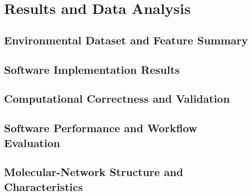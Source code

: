 
\chapter{Results and Data Analysis}\label{ch:results}

  \section{Environmental Dataset and Feature Summary}\label{sec:dataset-summary}

  \section{Software Implementation Results}\label{sec:implementation-results}

  \section{Computational Correctness and Validation}\label{sec:correctness-validation}

  \section{Software Performance and Workflow Evaluation}\label{sec:performance-results}

  \section{Molecular-Network Structure and Characteristics}\label{sec:network-results}

